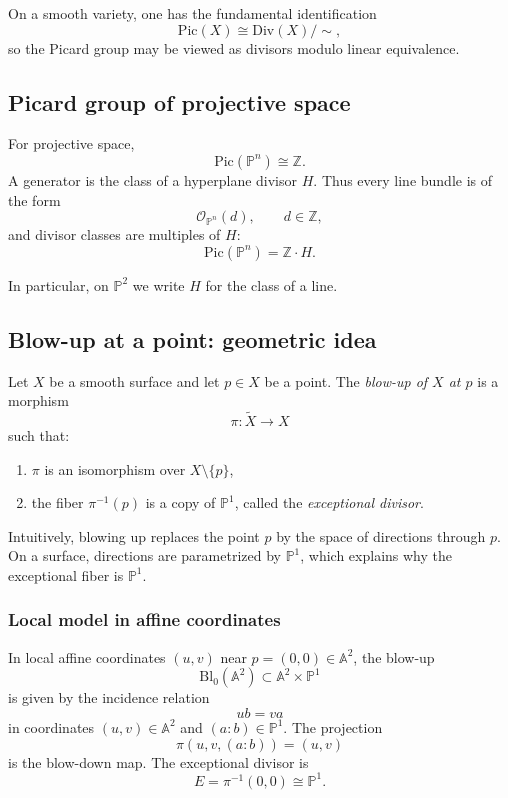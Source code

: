 \documentclass[12pt,a4paper]{article}
\theoremstyle{plain}
\theoremstyle{definition}      %
\begin{document}
On a smooth variety, one has the fundamental identification
\[
\mathrm{Pic}(X)
\cong
\mathrm{Div}(X)\big/\sim,
\]
so the Picard group may be viewed as divisors modulo linear equivalence.

\subsection*{Picard group of projective space}

For projective space,
\[
\mathrm{Pic}(\mathbb P^n)\cong \mathbb Z.
\]
A generator is the class of a hyperplane divisor $H$.
Thus every line bundle is of the form
\[
\mathcal O_{\mathbb P^n}(d),
\qquad
d\in\mathbb Z,
\]
and divisor classes are multiples of $H$:
\[
\mathrm{Pic}(\mathbb P^n)=\mathbb Z\cdot H.
\]

In particular, on $\mathbb P^2$ we write $H$ for the class of a line.

\subsection*{Blow-up at a point: geometric idea}

Let $X$ be a smooth surface and let $p\in X$ be a point.
The \emph{blow-up of $X$ at $p$} is a morphism
\[
\pi:\widetilde X\to X
\]
such that:
\begin{enumerate}
	\item $\pi$ is an isomorphism over $X\setminus\{p\}$,
	\item the fiber $\pi^{-1}(p)$ is a copy of $\mathbb P^1$, called the \emph{exceptional divisor}.
\end{enumerate}

Intuitively, blowing up replaces the point $p$ by the space of directions through $p$.
On a surface, directions are parametrized by $\mathbb P^1$, which explains why the exceptional fiber is $\mathbb P^1$.

\subsubsection*{Local model in affine coordinates}

In local affine coordinates $(u,v)$ near $p=(0,0)\in \mathbb A^2$, the blow-up
\[
\mathrm{Bl}_0(\mathbb A^2)
\subset
\mathbb A^2\times \mathbb P^1
\]
is given by the incidence relation
\[
u b = v a
\]
in coordinates $(u,v)\in \mathbb A^2$ and $(a:b)\in \mathbb P^1$.
The projection
\[
\pi(u,v,(a:b))=(u,v)
\]
is the blow-down map.
The exceptional divisor is
\[
E=\pi^{-1}(0,0)\cong \mathbb P^1.
\]
\end{document}
